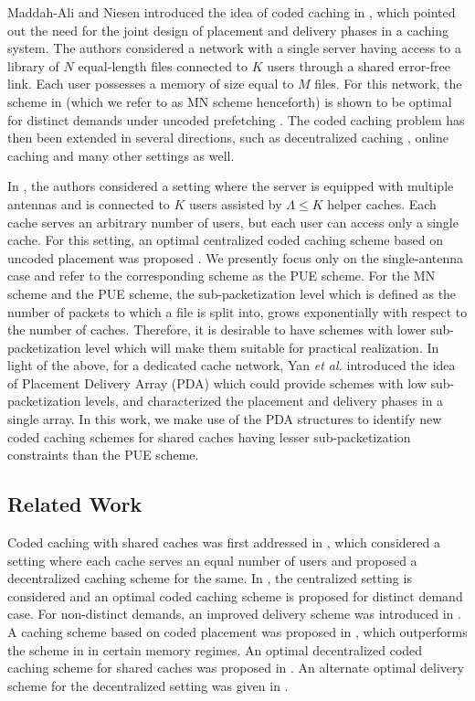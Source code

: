 \documentclass[conference,a4paper,10pt]{IEEEtran}
\begin{document}
Maddah-Ali and Niesen introduced the idea of coded caching  in \cite{MaN}, which pointed out the need for the joint design of placement and delivery phases in a caching system. The authors considered a network with a single server having access to a library of $N$ equal-length files connected to $K$ users through a shared error-free link. Each user possesses a memory of size equal to $M$ files. For this network, the scheme in \cite{MaN} (which we refer to as MN scheme henceforth) is shown to be optimal for distinct demands under uncoded prefetching \cite{YMA}. The coded caching problem has then been extended in several directions, such as decentralized caching \cite{MaN2}, online caching \cite{PMN} and many other settings as well. 

In \cite{PUE}, the authors considered a setting where the server is equipped with multiple antennas and is connected to $K$ users assisted by $\Lambda \leq K$ helper caches. Each cache serves an arbitrary number of users, but each user can access only a single cache. For this setting, an optimal centralized coded caching scheme based on uncoded placement was proposed \cite{PUE}. We presently focus only on the single-antenna case and refer to the corresponding scheme as the PUE scheme. For the MN scheme and the PUE scheme, the sub-packetization level which is defined as the number of packets to which a file is split into, grows exponentially with respect to the number of caches. Therefore, it is desirable to have schemes with lower sub-packetization level which will make them suitable for practical realization. In light of the above, for a dedicated cache network, Yan \textit{et al.} \cite{YCT} introduced the idea of Placement Delivery Array (PDA) which could provide schemes with low sub-packetization levels, and characterized the placement and delivery phases in a single array. In this work, we make use of the PDA structures to identify new coded caching schemes for shared caches having lesser sub-packetization constraints than the PUE scheme. 

\subsection{Related Work}
Coded caching with shared caches was first addressed in \cite{MaN2}, which considered a setting where each cache serves an equal number of users and proposed a decentralized caching scheme for the same. In \cite{PUE}, the centralized setting is considered and an optimal coded caching scheme is proposed for distinct demand case. For non-distinct demands, an improved delivery scheme was introduced in  \cite{KDTR}. A caching scheme based on coded placement was proposed in \cite{IZY}, which outperforms the scheme in \cite{PUE} in certain memory regimes. An optimal decentralized coded caching scheme for shared caches was proposed in \cite{DuTh}. An alternate optimal delivery scheme for the decentralized setting was given in \cite{PR}. 
\end{document}
